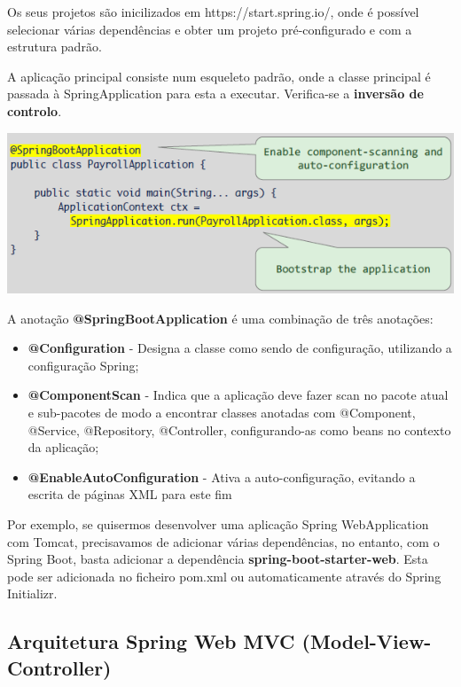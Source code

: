 \documentclass{article}
\begin{document}
Os seus projetos são inicilizados em https://start.spring.io/, onde é possível selecionar várias
dependências e obter um projeto pré-configurado e com a estrutura padrão.

\vspace{2mm}

A aplicação principal consiste num esqueleto padrão, onde a classe principal é passada à
SpringApplication para esta a executar. Verifica-se a \textbf{inversão de controlo}.

\begin{center}
  \includegraphics[scale=0.5]{90}
\end{center}

A anotação \textbf{@SpringBootApplication} é uma combinação de três anotações:
\begin{itemize}
  \item \textbf{@Configuration} - Designa a classe como sendo de configuração,
  utilizando a configuração Spring;
  \item \textbf{@ComponentScan} - Indica que a aplicação deve fazer
  scan no pacote atual e sub-pacotes de modo a encontrar
  classes anotadas com @Component, @Service, @Repository, @Controller,
  configurando-as como beans no contexto da aplicação;
  \item \textbf{@EnableAutoConfiguration} - Ativa a auto-configuração, evitando a escrita de páginas XML para este fim
\end{itemize}

Por exemplo, se quisermos desenvolver uma aplicação Spring WebApplication
com Tomcat, precisavamos de adicionar várias dependências, no
entanto, com o Spring Boot, basta adicionar a dependência
\textbf{spring-boot-starter-web}. Esta pode ser adicionada
no ficheiro pom.xml ou automaticamente através do Spring Initializr.

\subsection{Arquitetura Spring Web MVC (Model-View-Controller)}
\end{document}
